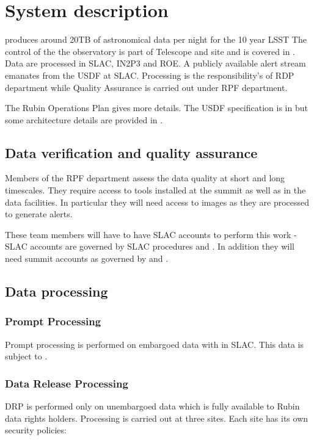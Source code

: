 \section{System description} \label{sec:desc}

\VRO produces around 20TB of astronomical data per night for the 10 year \gls{LSST}
The control of the the observatory is part of Telescope and site and is covered in .
Data are processed in \gls{SLAC}, \gls{IN2P3} and \gls{ROE}.
A publicly available alert stream emanates from the \gls{USDF} at \gls{SLAC}.
Processing is the responsibility's of \gls{RDP} department while \gls{Quality Assurance} is carried out under \gls{RPF} department.

The Rubin \gls{Operations} Plan  gives more details.
The \gls{USDF} specification is in  but some architecture details are provided in .






\subsection{Data verification and quality assurance }
Members of the \gls{RPF} department assess the data quality at short and long timescales.
They require access to tools installed at the summit as well as in the data facilities.
In particular they will need access to images as they are processed to generate alerts.

These team members will have to have \gls{SLAC} accounts to perform this work - \gls{SLAC} accounts are governed by SLAC procedures \cite{SLACOB} and \cite{SLACNH}.
In addition they will need summit accounts as governed by  and .



\subsection{Data processing}
\subsubsection{Prompt  Processing}
Prompt processing is performed on embargoed data with in SLAC.
This data is subject to \citep{ACP}.

\subsubsection{Data Release Processing}
DRP is performed only on unembargoed data which is fully available to Rubin data rights holders.
Processing is carried out at three sites.
Each site has its own security policies:

